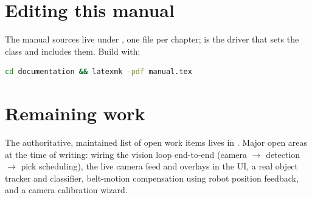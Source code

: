 \section{Editing this manual}
%
The manual sources live under , one file per
chapter;  is the driver that sets the class
and includes them. Build with:
\begin{lstlisting}[language=bash]
cd documentation && latexmk -pdf manual.tex
\end{lstlisting}

\section{Remaining work}
%
The authoritative, maintained list of open work items lives in
. Major open areas at the time of writing:
wiring the vision loop end-to-end (camera $\rightarrow$ detection
$\rightarrow$ pick scheduling), the live camera feed and overlays in the
UI, a real object tracker and classifier, belt-motion compensation using
robot position feedback, and a camera calibration wizard.
